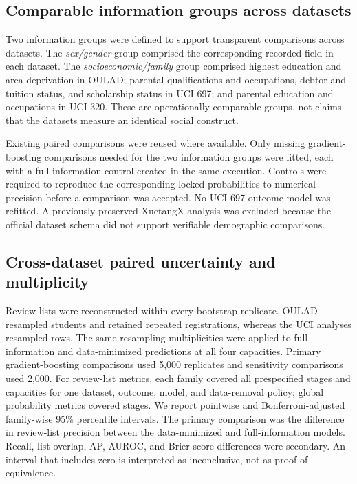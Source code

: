 \documentclass[education,article,submit,moreauthors]{Definitions/mdpi}
\begin{document}
\subsection{Comparable information groups across datasets}

Two information groups were defined to support transparent comparisons across datasets. The \emph{sex/gender} group comprised the corresponding recorded field in each dataset. The \emph{socioeconomic/family} group comprised highest education and area deprivation in OULAD; parental qualifications and occupations, debtor and tuition status, and scholarship status in UCI 697; and parental education and occupations in UCI 320. These are operationally comparable groups, not claims that the datasets measure an identical social construct.

Existing paired comparisons were reused where available. Only missing gradient-boosting comparisons needed for the two information groups were fitted, each with a full-information control created in the same execution. Controls were required to reproduce the corresponding locked probabilities to numerical precision before a comparison was accepted. No UCI 697 outcome model was refitted. A previously preserved XuetangX analysis was excluded because the official dataset schema did not support verifiable demographic comparisons.

\subsection{Cross-dataset paired uncertainty and multiplicity}

Review lists were reconstructed within every bootstrap replicate. OULAD resampled students and retained repeated registrations, whereas the UCI analyses resampled rows. The same resampling multiplicities were applied to full-information and data-minimized predictions at all four capacities. Primary gradient-boosting comparisons used 5,000 replicates and sensitivity comparisons used 2,000. For review-list metrics, each family covered all prespecified stages and capacities for one dataset, outcome, model, and data-removal policy; global probability metrics covered stages. We report pointwise and Bonferroni-adjusted family-wise 95\% percentile intervals. The primary comparison was the difference in review-list precision between the data-minimized and full-information models. Recall, list overlap, AP, AUROC, and Brier-score differences were secondary. An interval that includes zero is interpreted as inconclusive, not as proof of equivalence.
\end{document}
